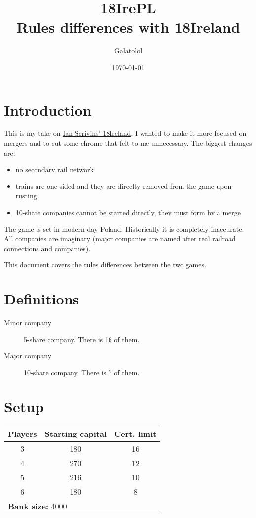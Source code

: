 \documentclass[10pt,a4paper,twocolumn]{article}
\title{18IrePL\\ \large{Rules differences with 18Ireland}}
\author{Galatolol}
\date{\today}
\begin{document}
\maketitle

\section{Introduction}
This is my take on \href{https://boardgamegeek.com/boardgame/196217/18ireland}{Ian Scrivins' 18Ireland}. I wanted to make it more focused on mergers and to cut some chrome that felt to me unnecessary. The biggest changes are: 
\begin{itemize}
\item no secondary rail network
\item trains are one-sided and they are direclty removed from the game upon rusting
\item 10-share companies cannot be started directly, they must form by a merge
\end{itemize}

The game is set in modern-day Poland. Historically it is completely inaccurate. All companies are imaginary (major companies are named after real railroad connections and companies).

This document covers the rules differences between the two games.



\section{Definitions}
\begin{description}
	\item [Minor company] 5-share company. There is 16 of them.
	\item [Major company] 10-share company. There is 7 of them.
\end{description}

\section{Setup}

\begin{center}
  \begin{tabular}{ | c | c | c | }
    \hline
    \textbf{Players} & \textbf{Starting capital} & \textbf{Cert. limit} \\ \hline
    3 & 180 & 16 \\ \hline
    4 & 270 & 12 \\ \hline
    5 & 216 & 10 \\ \hline
    6 & 180 & 8 \\ 
    \hline
      \multicolumn{3}{|l|}{\textbf{Bank size:} 4000} \\
 	\hline

  \end{tabular}
\end{center}
\end{document}
